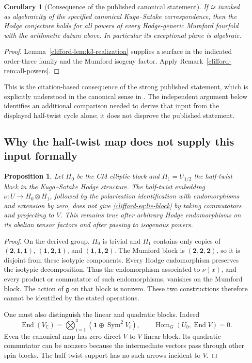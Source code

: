 \documentclass[11pt]{article}
\newtheorem{proposition}[theorem]{Proposition}
\newtheorem{corollary}[theorem]{Corollary}
\theoremstyle{definition}
\theoremstyle{remark}
\begin{document}
\begin{corollary}[Consequence of the published canonical statement]
\label{clifford-cor:published-input}
If \cite[Theorem~4.4 and Proposition~6.2]{clifford-BL} is invoked as
algebraicity of the specified canonical Kuga--Satake correspondence,
then the Hodge conjecture holds for all powers of every Hodge-generic
Mumford fourfold with the arithmetic datum above.
In particular its exceptional plane is algebraic.
\end{corollary}
\begin{proof}
Lemma~\ref{clifford-lem:k3-realization} supplies a surface in the indicated
order-three family and the Mumford isogeny factor.
Apply Remark~\ref{clifford-rem:all-powers}.
\end{proof}
This is the citation-based consequence of the strong published
statement, which is explicitly understood in the canonical sense
in \cite[\S3.3]{clifford-Floccari}.  The independent argument below
identifies an additional comparison needed to derive that input
from the displayed half-twist cycle alone; it does not disprove
the published statement.

\subsection{Why the half-twist map does not supply this input formally}

\begin{proposition}\label{clifford-prop:half-twist-obstruction}
Let $H_0$ be the CM elliptic block and $H_1=U_{1/2}$ the half-twist
block in the Kuga--Satake Hodge structure.  The half-twist embedding
$\nu:U\to H_0\otimes H_1$, followed by the polarization identification
with endomorphisms and extension by zero, does not give
\eqref{clifford-eq:lie-block} by taking commutators and projecting to $V$.
This remains true after arbitrary Hodge endomorphisms on its abelian
tensor factors and after passing to isogenous powers.
\end{proposition}
\begin{proof}
On the derived group, $H_0$ is trivial and $H_1$ contains only copies of
$(\mathbf2,\mathbf1,\mathbf1)$,
$(\mathbf1,\mathbf2,\mathbf1)$, and
$(\mathbf1,\mathbf1,\mathbf2)$.  The Mumford block is
$(\mathbf2,\mathbf2,\mathbf2)$, so it is disjoint from these isotypic
components.  Every Hodge endomorphism preserves the isotypic
decomposition.  Thus the endomorphism associated to $\nu(x)$, and
every product or commutator of such endomorphisms, vanishes on the
Mumford block.  The action of $\mathfrak g$ on that block is nonzero.
These two constructions therefore cannot be identified by the stated
operations.

One must also distinguish the linear and quadratic blocks.  Indeed
\[
 \operatorname{End}(V_{\mathbb C})
  =\bigotimes_{i=1}^3(\mathbf1\oplus\operatorname{Sym}^2V_i),
 \qquad
 \operatorname{Hom}_G(U_0,\operatorname{End}V)=0.
\]
Even the canonical map has zero direct $V$-to-$V$ linear block.  Its
quadratic commutator can be nonzero because the intermediate vectors
pass through other spin blocks.  The half-twist support has no such
arrows incident to $V$.
\end{proof}
\end{document}
